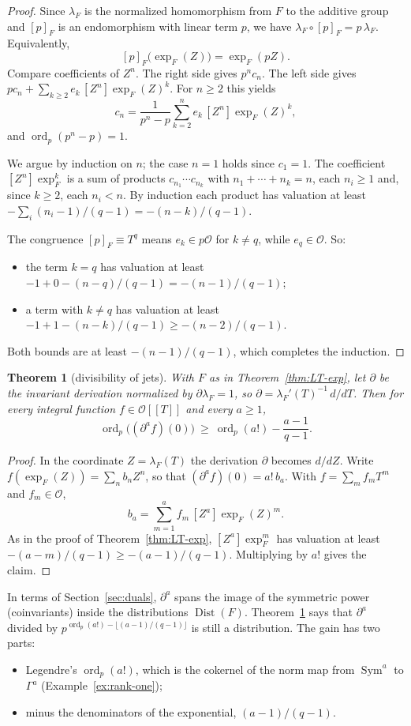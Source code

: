 \documentclass[11pt]{amsart}
\newtheorem{theorem}{Theorem}[section]
\theoremstyle{definition}
\theoremstyle{remark}
\DeclareMathOperator{\Sym}{Sym}
\DeclareMathOperator{\ord}{ord}
\DeclareMathOperator{\Dist}{Dist}
\begin{document}
\begin{proof}
Since $\lambda_F$ is the normalized homomorphism from $F$ to the additive group and $[p]_F$ is an endomorphism with linear term $p$, we have $\lambda_F\circ[p]_F=p\,\lambda_F$. Equivalently,
\[
[p]_F\bigl(\exp_F(Z)\bigr)=\exp_F(pZ).
\]
Compare coefficients of $Z^n$. The right side gives $p^nc_n$. The left side gives $pc_n+\sum_{k\ge2}e_k\,[Z^n]\exp_F(Z)^k$. For $n\ge2$ this yields
\[
c_n=\frac{1}{p^n-p}\sum_{k=2}^{n}e_k\,[Z^n]\exp_F(Z)^k ,
\]
and $\ord_p(p^n-p)=1$.

We argue by induction on $n$; the case $n=1$ holds since $c_1=1$. The coefficient $[Z^n]\exp_F^k$ is a sum of products $c_{n_1}\cdots c_{n_k}$ with $n_1+\cdots+n_k=n$, each $n_i\ge 1$ and, since $k\ge2$, each $n_i<n$. By induction each product has valuation at least $-\sum_i(n_i-1)/(q-1)=-(n-k)/(q-1)$.

The congruence $[p]_F\equiv T^q$ means $e_k\in p\mathcal O$ for $k\ne q$, while $e_q\in\mathcal O$. So:
\begin{itemize}
\item the term $k=q$ has valuation at least $-1+0-(n-q)/(q-1)=-(n-1)/(q-1)$;
\item a term with $k\ne q$ has valuation at least $-1+1-(n-k)/(q-1)\ge-(n-2)/(q-1)$.
\end{itemize}
Both bounds are at least $-(n-1)/(q-1)$, which completes the induction.
\end{proof}

\begin{theorem}[divisibility of jets]\label{thm:jet-gain}
With $F$ as in Theorem~\ref{thm:LT-exp}, let $\partial$ be the invariant derivation normalized by $\partial\lambda_F=1$, so $\partial=\lambda_F'(T)^{-1}\,d/dT$. Then for every integral function $f\in\mathcal O[[T]]$ and every $a\ge1$,
\[
\ord_p\bigl((\partial^af)(0)\bigr)\ \ge\ \ord_p(a!)-\frac{a-1}{q-1}.
\]
\end{theorem}

\begin{proof}
In the coordinate $Z=\lambda_F(T)$ the derivation $\partial$ becomes $d/dZ$. Write $f(\exp_F(Z))=\sum_nb_nZ^n$, so that $(\partial^af)(0)=a!\,b_a$. With $f=\sum_mf_mT^m$ and $f_m\in\mathcal O$,
\[
b_a=\sum_{m=1}^{a}f_m\,[Z^a]\exp_F(Z)^m .
\]
As in the proof of Theorem~\ref{thm:LT-exp}, $[Z^a]\exp_F^m$ has valuation at least $-(a-m)/(q-1)\ge-(a-1)/(q-1)$. Multiplying by $a!$ gives the claim.
\end{proof}

In terms of Section~\ref{sec:duals}, $\partial^a$ spans the image of the symmetric power (coinvariants) inside the distributions $\Dist(F)$. Theorem~\ref{thm:jet-gain} says that $\partial^a$ divided by $p^{\ord_p(a!)-\lfloor(a-1)/(q-1)\rfloor}$ is still a distribution. The gain has two parts:
\begin{itemize}
\item Legendre's $\ord_p(a!)$, which is the cokernel of the norm map from $\Sym^a$ to $\Gamma^a$ (Example~\ref{ex:rank-one});
\item minus the denominators of the exponential, $(a-1)/(q-1)$.
\end{itemize}
\end{document}
